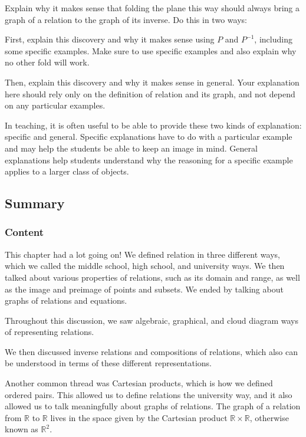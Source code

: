 \documentclass[11pt]{article}
\newenvironment{task}
	{\begin{mdframed}[linecolor=lightgray, linewidth=3pt]\raggedright}
	{\end{mdframed}}
\newcommand{\R}{\mathbb{R}}
\theoremstyle{definition}
\begin{document}
\begin{task}
Explain why it makes sense that folding the plane this way should always bring a graph of a relation to the graph of its inverse. Do this in two ways:
	\begin{itemize*}
	\item First, explain this discovery and why it makes sense using $P$ and $P^{-1}$, including some specific examples. Make sure to use specific examples and also explain why no other fold will work.
	\item Then, explain this discovery and why it makes sense in general. Your explanation here should rely only on the definition of relation and its graph, and not depend on any particular examples. 
	\end{itemize*}
\end{task}

In teaching, it is often useful to be able to provide these two kinds of explanation: specific and general. Specific explanations have to do with a particular example and may help the students be able to keep an image in mind. General explanations help students understand why the reasoning for a specific example applies to a larger class of objects.

\newpage
\subsection{Summary}

\subsubsection*{Content}
This chapter had a lot going on! We defined relation in three different ways, which we called the middle school, high school, and university ways. We then talked about various properties of relations, such as its domain and range, as well as the image and preimage of points and subsets. We ended by talking about graphs of relations and equations.

Throughout this discussion, we saw algebraic, graphical, and cloud diagram ways of representing relations. 

We then discussed inverse relations and compositions of relations, which also can be understood in terms of these different representations. 
 
 Another common thread was Cartesian products, which is how we defined ordered pairs.  This allowed us to define relations the university way, and it also allowed us to talk meaningfully about graphs of relations.  The graph of a relation from $\R$ to $\R$ lives in the space given by the Cartesian product $\R\times \R$, otherwise known as $\R^2$. 
 
\end{document}
